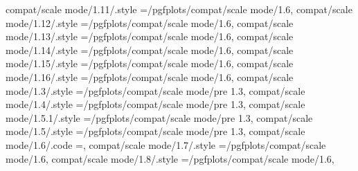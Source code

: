 {{{{{{{{{{{{{{{{{{{compat/scale mode/1.11/.style                                      ={/pgfplots/compat/scale mode/1.6},                                                                                                 
compat/scale mode/1.12/.style                                      ={/pgfplots/compat/scale mode/1.6},                                                                                                 
compat/scale mode/1.13/.style                                      ={/pgfplots/compat/scale mode/1.6},                                                                                                 
compat/scale mode/1.14/.style                                      ={/pgfplots/compat/scale mode/1.6},                                                                                                 
compat/scale mode/1.15/.style                                      ={/pgfplots/compat/scale mode/1.6},                                                                                                 
compat/scale mode/1.16/.style                                      ={/pgfplots/compat/scale mode/1.6},                                                                                                 
compat/scale mode/1.3/.style                                       ={/pgfplots/compat/scale mode/pre 1.3},                                                                                             
compat/scale mode/1.4/.style                                       ={/pgfplots/compat/scale mode/pre 1.3},                                                                                             
compat/scale mode/1.5.1/.style                                     ={/pgfplots/compat/scale mode/pre 1.3},                                                                                             
compat/scale mode/1.5/.style                                       ={/pgfplots/compat/scale mode/pre 1.3},                                                                                             
compat/scale mode/1.6/.code                                        =\def\pgfplots@compat@scale@mode@compatible@mode{0},                                                                                
compat/scale mode/1.7/.style                                       ={/pgfplots/compat/scale mode/1.6},                                                                                                 
compat/scale mode/1.8/.style                                       ={/pgfplots/compat/scale mode/1.6},                                                                                                 
}}}}}}}}}}}}}}}}}}}

